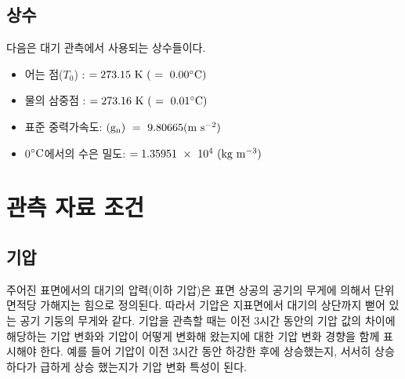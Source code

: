 \subsection{상수}

다음은 대기 관측에서 사용되는 상수들이다.

\begin{itemize}
	\item 어는 점($T_0$) : $\rm {= 273.15~K~(~=~0.00 ^{\circ}C)}$
	\item 물의 삼중점 : $\rm {= 273.16~K~(~=~0.01 ^{\circ}C)}$
	\item 표준 중력가속도: $\rm {(g_n)~=~9.80665(m~s^{-2})}$
	\item 0$\rm ^{\circ}C$에서의 수은 밀도: $\rm {= 1.35951~ \times ~10^4~(kg~m^{-3})}$
\end{itemize}

\section{관측 자료 조건}
\subsection{기압}

주어진 표면에서의 대기의 압력(이하 기압)은 표면 상공의 공기의 무게에 의해서 단위 면적당 가해지는 힘으로 정의된다. 따라서 기압은 지표면에서 대기의 상단까지 뻗어 있는 공기 기둥의 무게와 같다. 기압을 관측할 때는 이전 3시간 동안의 기압 값의 차이에 해당하는 기압 변화와 기압이 어떻게 변화해 왔는지에 대한 기압 변화 경향을 함께 표시해야 한다. 예를 들어 기압이 이전 3시간 동안 하강한 후에 상승했는지, 서서히 상승 하다가 급하게 상승 했는지가 기압 변화 특성이 된다.

